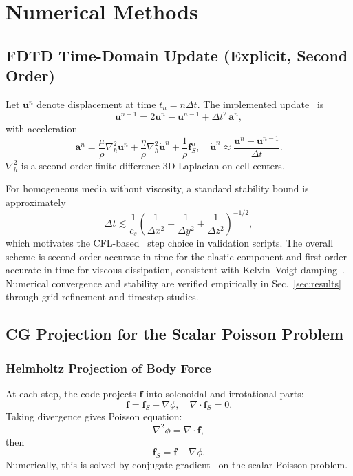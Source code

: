 \documentclass[11pt]{article}
\begin{document}
\section{Numerical Methods}
\subsection{FDTD Time-Domain Update (Explicit, Second Order)}
Let $\bm{u}^n$ denote displacement at time $t_n=n\Delta t$. The implemented update~\cite{taflove2005computational} is
\begin{equation}
\bm{u}^{n+1}
=
2\bm{u}^{n} - \bm{u}^{n-1}
+
\Delta t^2 \, \bm{a}^{n},
\end{equation}
with acceleration
\begin{equation}
\bm{a}^{n}
=
\frac{\mu}{\rho}\nabla_h^2 \bm{u}^{n}
+
\frac{\eta}{\rho}\nabla_h^2 \dot{\bm{u}}^{n}
+
\frac{1}{\rho}\bm{f}_S^{n},
\quad
\dot{\bm{u}}^{n}\approx\frac{\bm{u}^{n}-\bm{u}^{n-1}}{\Delta t}.
\end{equation}
$\nabla_h^2$ is a second-order finite-difference 3D Laplacian on cell centers.

For homogeneous media without viscosity, a standard stability bound is approximately
\begin{equation}
\Delta t \lesssim \frac{1}{c_s}
\left(
\frac{1}{\Delta x^2}+\frac{1}{\Delta y^2}+\frac{1}{\Delta z^2}
\right)^{-1/2},
\end{equation}
which motivates the CFL-based~\cite{courant1928partial} step choice in validation scripts. The overall scheme is second-order accurate in time for the elastic component
and first-order accurate in time for viscous dissipation, consistent with
Kelvin--Voigt damping~\cite{catheline2004viscoelastic}. Numerical convergence and stability are verified empirically in
Sec.~\ref{sec:results} through grid-refinement and timestep studies.

\subsection{CG Projection for the Scalar Poisson Problem}
\subsubsection{Helmholtz Projection of Body Force}
At each step, the code projects $\bm{f}$ into solenoidal and irrotational parts:
\begin{equation}
\bm{f} = \bm{f}_S + \nabla \phi,
\quad
\nabla\cdot\bm{f}_S=0.
\end{equation}
Taking divergence gives Poisson equation:
\begin{equation}
\nabla^2 \phi = \nabla\cdot\bm{f},
\end{equation}
then
\begin{equation}
\bm{f}_S = \bm{f} - \nabla\phi.
\end{equation}
Numerically, this is solved by conjugate-gradient~\cite{golub2013matrix,shewchuk1994conjugate} on the scalar Poisson problem.
\end{document}
